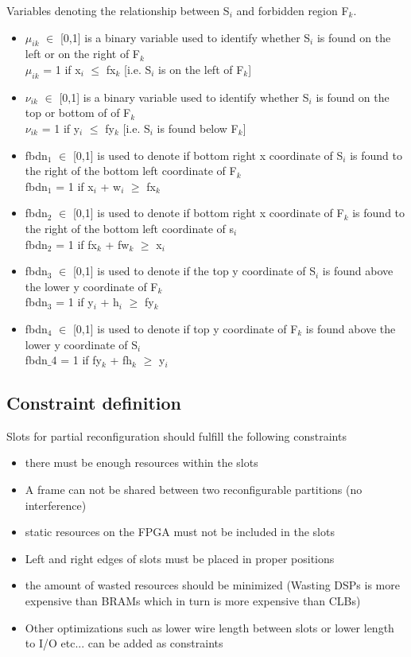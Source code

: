 \hfill \break

Variables denoting the relationship between S$_i$ and forbidden region F$_k$.  
\begin{itemize}
\item $\mu_{ik}$ $\in$ [0,1] is a binary variable used to identify whether S$_i$ is found on the left or on the right of F$_k$\\
$\mu_{ik}$ = 1 if x$_i$ $\leq$ fx$_k$ [i.e. S$_i$ is on the left of F$_k$]

\item $\nu_{ik}$ $\in$ [0,1] is a binary variable used to identify whether S$_i$ is found on the top or bottom of of F$_k$\\
$\nu_{ik}$ = 1 if y$_i$ $\leq$ fy$_k$ [i.e. S$_i$ is found below F$_k$]

\item fbdn$_1$ $\in$ [0,1] is used to denote if bottom right x coordinate of S$_i$ is found to the right of the bottom left coordinate of F$_k$ \\
fbdn$_1$ = 1 if x$_i$ + w$_i$ $\geq$ fx$_k$

\item fbdn$_2$ $\in$ [0,1] is used to denote if bottom right x coordinate of F$_k$ is found to the right of the bottom left coordinate of s$_i$ \\
fbdn$_2$ = 1 if fx$_k$ + fw$_k$ $\geq$ x$_i$

\item fbdn$_3$ $\in$ [0,1] is used to denote if the top y coordinate of S$_i$ is found above the lower y coordinate of F$_k$ \\
fbdn$_3$ = 1 if y$_i$ + h$_i$ $\geq$ fy$_k$

\item fbdn$_4$ $\in$ [0,1] is used to denote if top y coordinate of F$_k$ is found above the lower y coordinate of S$_i$ \\
fbdn$\_4$ = 1 if fy$_k$ + fh$_k$ $\geq$ y$_i$
\end{itemize}

\hfill \break

\subsection{Constraint definition}
Slots for partial reconfiguration should fulfill the following constraints
\begin{itemize}
\item there must be enough resources within the slots
\item A frame can not be shared between two reconfigurable partitions (no interference)
\item static resources on the FPGA must not be included in the slots 
\item Left and right edges of slots must be placed in proper positions
\item the amount of wasted resources should be minimized (Wasting DSPs is more expensive than BRAMs which in turn is more expensive than CLBs)
\item Other optimizations such as lower wire length between slots or lower length to I/O etc... can be added as constraints
\end{itemize}

